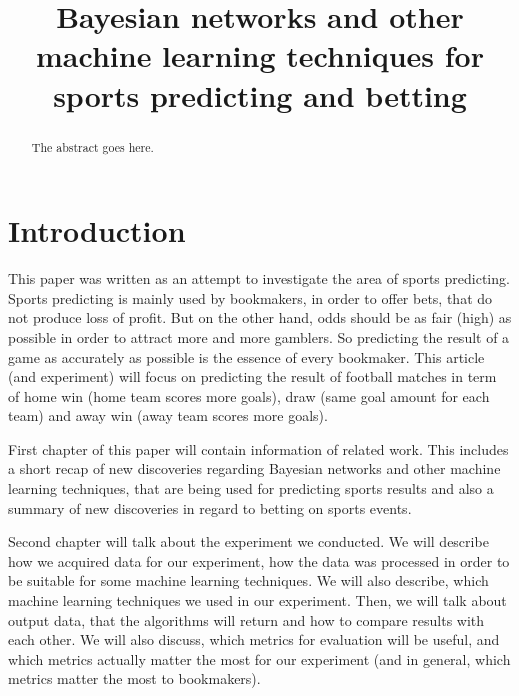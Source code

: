 \documentclass[conference]{IEEEtran}
\begin{document}
\title{Bayesian networks and other machine learning techniques for sports predicting and betting}

\author{
}


\maketitle

\begin{abstract}
The abstract goes here.
\end{abstract}

\IEEEpeerreviewmaketitle

\section{Introduction}

This paper was written as an attempt to investigate the area of sports predicting.
Sports predicting is mainly used by bookmakers, in order to offer bets, that do 
not produce loss of profit. But on the other hand, odds should be as fair (high) as possible
in order to attract more and more gamblers. So predicting the result of a game as accurately
as possible is the essence of every bookmaker. This article (and experiment) will focus on 
predicting the result of football matches in term of home win (home team scores more goals),
draw (same goal amount for each team) and away win (away team scores more goals).

First chapter of this paper will contain information of related work. This includes a 
short recap of new discoveries regarding Bayesian networks and other machine learning 
techniques, that are being used for predicting sports results and also a summary of 
new discoveries in regard to betting on sports events.

Second chapter will talk about the experiment we conducted. We will describe how we acquired 
data for our experiment, how the data was processed in order to be suitable for some machine 
learning techniques. We will also describe, which machine learning techniques we used in 
our experiment. Then, we will talk about output data, that the algorithms will 
return and how to compare results with each other. We will also discuss, which metrics 
for evaluation will be useful, and which metrics actually matter the most for our 
experiment (and in general, which metrics matter the most to bookmakers).
\end{document}
